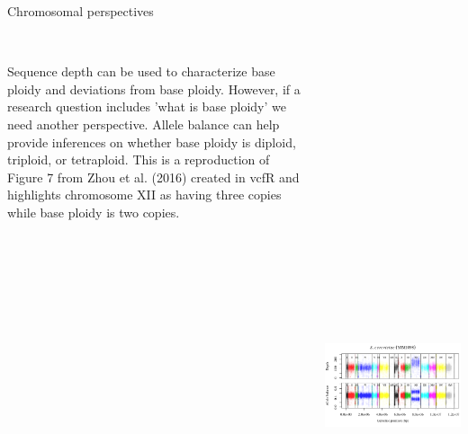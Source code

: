 \begin{columns}[t]
  \begin{column}{0.5\textwidth}
    \begin{block}{\large Chromosomal perspectives}
      \begin{columns}
        \begin{column}{0.4\textwidth}
\scriptsize
\\
\vspace{1mm}
Sequence depth can be used to characterize base ploidy and deviations from base ploidy.
However, if a research question includes 'what is base ploidy' we need another perspective.
Allele balance can help provide inferences on whether base ploidy is diploid, triploid, or tetraploid.
This is a reproduction of Figure 7 from Zhou et al. (2016) created in vcfR and highlights chromosome XII as having three copies while base ploidy is two copies.
        \end{column}
        \begin{column}{0.55\textwidth}
          \includegraphics[height=20cm]{./figures/fig4_chrom_YJM1098.png}

\end{column}
\end{columns}
\end{block}
\end{column}
\end{columns}
